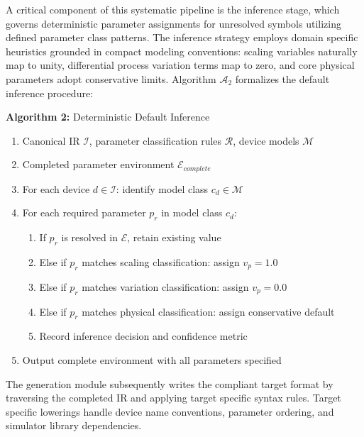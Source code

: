 \documentclass[10pt,twocolumn]{article}
\begin{document}
A critical component of this systematic pipeline is the inference stage, which governs deterministic parameter assignments for unresolved symbols utilizing defined parameter class patterns. The inference strategy employs domain specific heuristics grounded in compact modeling conventions: scaling variables naturally map to unity, differential process variation terms map to zero, and core physical parameters adopt conservative limits. Algorithm $\mathcal{A}_2$ formalizes the default inference procedure:

\smallskip
\noindent \textbf{Algorithm 2:} Deterministic Default Inference
\begin{enumerate}
\item[\textbf{Input:}] Canonical IR $\mathcal{I}$, parameter classification rules $\mathcal{R}$, device models $\mathcal{M}$
\item[\textbf{Output:}] Completed parameter environment $\mathcal{E}_{complete}$
\item For each device $d \in \mathcal{I}$: identify model class $c_d \in \mathcal{M}$
\item For each required parameter $p_r$ in model class $c_d$:
  \begin{enumerate}
    \item If $p_r$ is resolved in $\mathcal{E}$, retain existing value
    \item Else if $p_r$ matches scaling classification: assign $v_p = 1.0$
    \item Else if $p_r$ matches variation classification: assign $v_p = 0.0$
    \item Else if $p_r$ matches physical classification: assign conservative default
    \item Record inference decision and confidence metric
  \end{enumerate}
\item Output complete environment with all parameters specified
\end{enumerate}

The generation module subsequently writes the compliant target format by traversing the completed IR and applying target specific syntax rules. Target specific lowerings handle device name conventions, parameter ordering, and simulator library dependencies.
\end{document}
